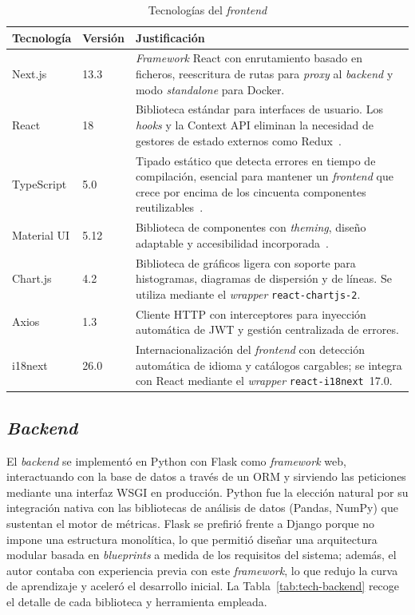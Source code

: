 \begin{table}[htbp]
  \centering
  \caption{Tecnologías del \emph{frontend}}
  \label{tab:tech-frontend}
  \begin{tabularx}{\textwidth}{l l X}
    \toprule
    \textbf{Tecnología} & \textbf{Versión} & \textbf{Justificación} \\
    \midrule
    Next.js   & 13.3 & \emph{Framework} React con enrutamiento basado en
      ficheros, reescritura de rutas para \emph{proxy} al \emph{backend} y
      modo \emph{standalone} para Docker. \\
    React     & 18   & Biblioteca estándar para interfaces de usuario.  Los
      \emph{hooks} y la Context \ac{API} eliminan la necesidad de gestores de
      estado externos como Redux~\citep{react}. \\
    TypeScript & 5.0 & Tipado estático que detecta errores en tiempo de
      compilación, esencial para mantener un \emph{frontend} que crece
      por encima de los cincuenta componentes reutilizables~\citep{typescript}. \\
    Material \ac{UI} & 5.12 & Biblioteca de componentes con \emph{theming},
      diseño adaptable y accesibilidad incorporada~\citep{materialui}. \\
    Chart.js  & 4.2  & Biblioteca de gráficos ligera con soporte para
      histogramas, diagramas de dispersión y de líneas.  Se utiliza mediante
      el \emph{wrapper} \texttt{react-chartjs-2}. \\
    Axios     & 1.3  & Cliente HTTP con interceptores para inyección
      automática de \ac{JWT} y gestión centralizada de errores. \\
    i18next   & 26.0 & Internacionalización del \emph{frontend} con
      detección automática de idioma y catálogos cargables; se integra con
      React mediante el \emph{wrapper} \texttt{react-i18next}~17.0. \\
    \bottomrule
  \end{tabularx}
\end{table}

\subsection{\emph{Backend}}
\label{sec:tech-backend}

El \emph{backend} se implementó en Python con Flask como \emph{framework}
web, interactuando con la base de datos a través de un \ac{ORM} y sirviendo las peticiones mediante una interfaz \ac{WSGI} en producción.  Python fue la elección natural por su integración nativa con las
bibliotecas de análisis de datos (Pandas, NumPy) que sustentan el motor de
métricas.  Flask se prefirió frente a Django porque no impone una estructura
monolítica, lo que permitió diseñar una arquitectura modular basada en
\emph{blueprints} a medida de los requisitos del sistema; además, el
autor contaba con experiencia previa con este \emph{framework}, lo que
redujo la curva de aprendizaje y aceleró el desarrollo inicial.
La Tabla~\ref{tab:tech-backend} recoge el detalle de cada biblioteca y
herramienta empleada.



